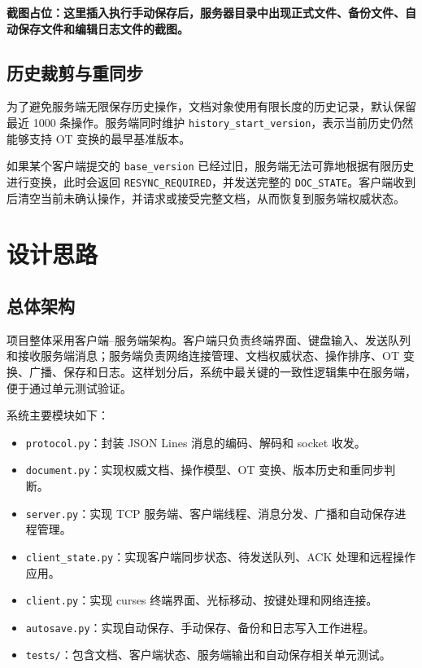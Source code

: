 \textbf{截图占位：这里插入执行手动保存后，服务器目录中出现正式文件、备份文件、自动保存文件和编辑日志文件的截图。}

\subsection{历史裁剪与重同步}

为了避免服务端无限保存历史操作，文档对象使用有限长度的历史记录，默认保留最近 1000 条操作。服务端同时维护 \verb|history_start_version|，表示当前历史仍然能够支持 OT 变换的最早基准版本。

如果某个客户端提交的 \verb|base_version| 已经过旧，服务端无法可靠地根据有限历史进行变换，此时会返回 \verb|RESYNC_REQUIRED|，并发送完整的 \verb|DOC_STATE|。客户端收到后清空当前未确认操作，并请求或接受完整文档，从而恢复到服务端权威状态。

\section{设计思路}

\subsection{总体架构}

项目整体采用客户端--服务端架构。客户端只负责终端界面、键盘输入、发送队列和接收服务端消息；服务端负责网络连接管理、文档权威状态、操作排序、OT 变换、广播、保存和日志。这样划分后，系统中最关键的一致性逻辑集中在服务端，便于通过单元测试验证。

系统主要模块如下：

\begin{itemize}
  \item \verb|protocol.py|：封装 JSON Lines 消息的编码、解码和 socket 收发。
  \item \verb|document.py|：实现权威文档、操作模型、OT 变换、版本历史和重同步判断。
  \item \verb|server.py|：实现 TCP 服务端、客户端线程、消息分发、广播和自动保存进程管理。
  \item \verb|client_state.py|：实现客户端同步状态、待发送队列、ACK 处理和远程操作应用。
  \item \verb|client.py|：实现 curses 终端界面、光标移动、按键处理和网络连接。
  \item \verb|autosave.py|：实现自动保存、手动保存、备份和日志写入工作进程。
  \item \verb|tests/|：包含文档、客户端状态、服务端输出和自动保存相关单元测试。
\end{itemize}

